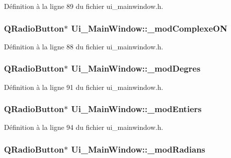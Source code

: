 \-Définition à la ligne 89 du fichier ui\-\_\-mainwindow.\-h.

\hypertarget{class_ui___main_window_a905fbcb76b7a5accc476b5c1c9391ea5}{
\subsubsection[{\-\_\-mod\-Complexe\-O\-N}]{\setlength{\rightskip}{0pt plus 5cm}\-Q\-Radio\-Button$\ast$ {\bf \-Ui\-\_\-\-Main\-Window\-::\-\_\-mod\-Complexe\-O\-N}}}\label{class_ui___main_window_a905fbcb76b7a5accc476b5c1c9391ea5}


\-Définition à la ligne 88 du fichier ui\-\_\-mainwindow.\-h.

\hypertarget{class_ui___main_window_a8d6879ed9b5c3d2cf3b9adda602ff3f2}{
\subsubsection[{\-\_\-mod\-Degres}]{\setlength{\rightskip}{0pt plus 5cm}\-Q\-Radio\-Button$\ast$ {\bf \-Ui\-\_\-\-Main\-Window\-::\-\_\-mod\-Degres}}}\label{class_ui___main_window_a8d6879ed9b5c3d2cf3b9adda602ff3f2}


\-Définition à la ligne 91 du fichier ui\-\_\-mainwindow.\-h.

\hypertarget{class_ui___main_window_a86335a0c2e9f36f7c9b8cd195b25a1c0}{
\subsubsection[{\-\_\-mod\-Entiers}]{\setlength{\rightskip}{0pt plus 5cm}\-Q\-Radio\-Button$\ast$ {\bf \-Ui\-\_\-\-Main\-Window\-::\-\_\-mod\-Entiers}}}\label{class_ui___main_window_a86335a0c2e9f36f7c9b8cd195b25a1c0}


\-Définition à la ligne 94 du fichier ui\-\_\-mainwindow.\-h.

\hypertarget{class_ui___main_window_a55f174647d09c0bd1a532524444d79ee}{
\subsubsection[{\-\_\-mod\-Radians}]{\setlength{\rightskip}{0pt plus 5cm}\-Q\-Radio\-Button$\ast$ {\bf \-Ui\-\_\-\-Main\-Window\-::\-\_\-mod\-Radians}}}\label{class_ui___main_window_a55f174647d09c0bd1a532524444d79ee}


